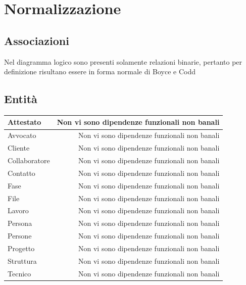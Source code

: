 \documentclass{elegantbook}
\begin{document}
	\section{Normalizzazione}
	\subsection{Associazioni}
	Nel diagramma logico sono presenti solamente relazioni binarie, pertanto per definizione risultano essere in forma normale di Boyce e Codd
	\subsection{Entità}
        \begin{longtable}{|p{8cm}|r|}
        \hline
            Attestato & Non vi sono dipendenze funzionali non banali \\
	\hline
            Avvocato & Non vi sono dipendenze funzionali non banali \\
	\hline
            Cliente & Non vi sono dipendenze funzionali non banali \\
	\hline
            Collaboratore & Non vi sono dipendenze funzionali non banali \\
	\hline
            Contatto & Non vi sono dipendenze funzionali non banali \\
	\hline
            Fase & Non vi sono dipendenze funzionali non banali \\
	\hline
            File & Non vi sono dipendenze funzionali non banali \\
	\hline
            Lavoro & Non vi sono dipendenze funzionali non banali \\
	\hline
            Persona & Non vi sono dipendenze funzionali non banali \\
	\hline
            Persone & Non vi sono dipendenze funzionali non banali \\
	\hline
            Progetto & Non vi sono dipendenze funzionali non banali \\
	\hline
            Struttura & Non vi sono dipendenze funzionali non banali \\
	\hline
            Tecnico & Non vi sono dipendenze funzionali non banali \\
	\hline    
        \end{longtable} 
	\newpage
\end{document}
